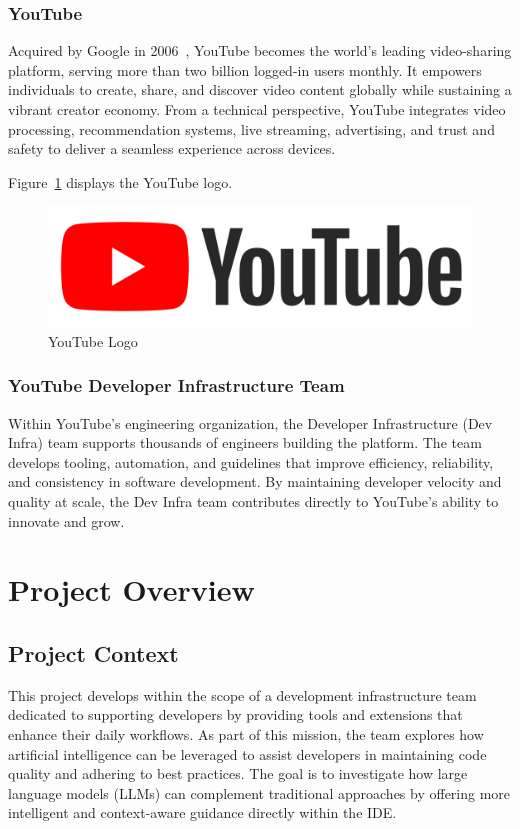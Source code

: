 \begin{spacing}{1.2}
\subsubsection{YouTube}
Acquired by Google in 2006~\cite{youtube2024platform}, YouTube becomes the world's leading video-sharing platform, serving more than two billion logged-in users monthly. It empowers individuals to create, share, and discover video content globally while sustaining a vibrant creator economy. From a technical perspective, YouTube integrates video processing, recommendation systems, live streaming, advertising, and trust and safety to deliver a seamless experience across devices.

Figure~\ref{fig:youtube_logo} displays the YouTube logo.

\begin{figure}[!ht]\centering
\includegraphics[scale=0.06]{Images/youtube_logo.png}
\caption{YouTube Logo}
\label{fig:youtube_logo}
\end{figure}

\subsubsection{YouTube Developer Infrastructure Team}
Within YouTube’s engineering organization, the Developer Infrastructure (Dev Infra) team supports thousands of engineers building the platform. The team develops tooling, automation, and guidelines that improve efficiency, reliability, and consistency in software development. By maintaining developer velocity and quality at scale, the Dev Infra team contributes directly to YouTube’s ability to innovate and grow.




\section{Project Overview}

\subsection{Project Context}
This project develops within the scope of a development infrastructure team dedicated to supporting developers by providing tools and extensions that enhance their daily workflows. As part of this mission, the team explores how artificial intelligence can be leveraged to assist developers in maintaining code quality and adhering to best practices. The goal is to investigate how large language models (LLMs) can complement traditional approaches by offering more intelligent and context-aware guidance directly within the IDE.  


\end{spacing}
